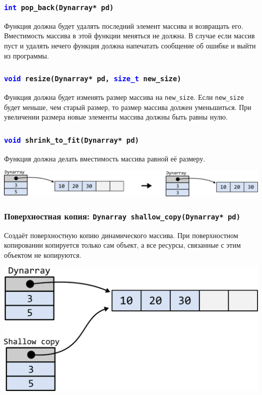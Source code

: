 \documentclass{article}
\begin{document}
\subsubsection{\texttt{\textcolor{blue}{int} pop\_back(Dynarray* pd)}}
Функция должна будет удалять последний элемент массива и возвращать его. Вместимость массива в этой функции меняться не должна. В случае если массив пуст и удалять нечего функция должна напечатать сообщение об ошибке и выйти из программы.


\subsubsection{\texttt{\textcolor{blue}{void} resize(Dynarray* pd, \textcolor{blue}{size\_t} new\_size)}}
Функция должна будет изменять размер массива на \texttt{new\_size}. Если \texttt{new\_size} будет меньше, чем старый размер, то размер массива должен уменьшиться. При увеличении размера новые элементы массива должны быть равны нулю.


\subsubsection{\texttt{\textcolor{blue}{void} shrink\_to\_fit(Dynarray* pd)}}
Функция должна делать вместимость массива равной её размеру.\\
\begin{center}
\includegraphics[scale=1]{../images/dynarray_shrink_to_fit.png}
\end{center}

\subsubsection{Поверхностная копия: \texttt{Dynarray shallow\_copy(Dynarray* pd)}}
Создаёт поверхностную копию динамического массива. При поверхностном копировании копируется только сам объект, а все ресурсы, связанные с этим объектом не копируются.
\begin{center}
\includegraphics[scale=0.8]{../images/dynarray_shallow.png}
\end{center}
\end{document}

